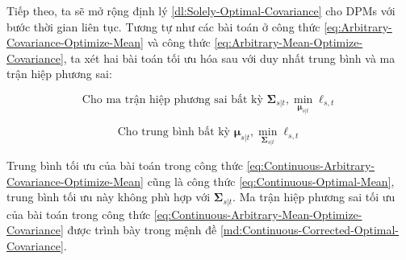 \documentclass[14pt, a4paper]{article}
\numberwithin{equation}{section}
\numberwithin{figure}{section}
\numberwithin{dl}{section}
\numberwithin{md}{section}
\numberwithin{bd}{section}
\numberwithin{dn}{section}
\numberwithin{hq}{section}
\begin{document}
    Tiếp theo, ta sẽ  mở rộng định lý \ref{dl:Solely-Optimal-Covariance} cho DPMs với bước thời gian liên tục.
    Tương tự như các bài toán ở công thức \ref{eq:Arbitrary-Covariance-Optimize-Mean} và công thức \ref{eq:Arbitrary-Mean-Optimize-Covariance},
    ta xét hai bài toán tối ưu hóa sau với duy nhất trung bình và ma trận hiệp phương sai:

    \begin{equation} \label{eq:Continuous-Arbitrary-Covariance-Optimize-Mean}
        \text{Cho ma trận hiệp phương sai bất kỳ } \boldsymbol{\Sigma}_{s \vert t}, \min_{\boldsymbol{\mu}_{s \vert t}} \ell_{s, t}
    \end{equation}

    \begin{equation} \label{eq:Continuous-Arbitrary-Mean-Optimize-Covariance}
        \text{Cho trung bình bất kỳ } \boldsymbol{\mu}_{s \vert t}, \min_{\boldsymbol{\Sigma}_{s \vert t}} \ell_{s, t}
    \end{equation}

    Trung bình tối ưu của bài toán trong công thức \ref{eq:Continuous-Arbitrary-Covariance-Optimize-Mean} cũng là công thức \ref{eq:Continuous-Optimal-Mean}, trung bình tối ưu này không phù hợp với $\boldsymbol{\Sigma}_{s \vert t}$.
    Ma trận hiệp phương sai tối ưu của bài toán trong công thức \ref{eq:Continuous-Arbitrary-Mean-Optimize-Covariance} được trình bày trong mệnh đề \ref{md:Continuous-Corrected-Optimal-Covariance}.
\end{document}
